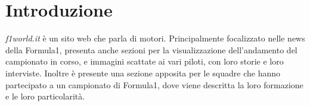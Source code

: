 \section{Introduzione}

\textit{f1world.it} \`e un sito web che parla di motori. Principalmente focalizzato nelle news della Formula1, presenta anche sezioni per la visualizzazione dell'andamento del campionato in corso, e immagini scattate ai vari piloti, con loro storie e loro interviste. Inoltre \`e presente una sezione apposita per le squadre che hanno partecipato a un campionato di Formula1, dove viene descritta la loro formazione e le loro particolarit\`a.

